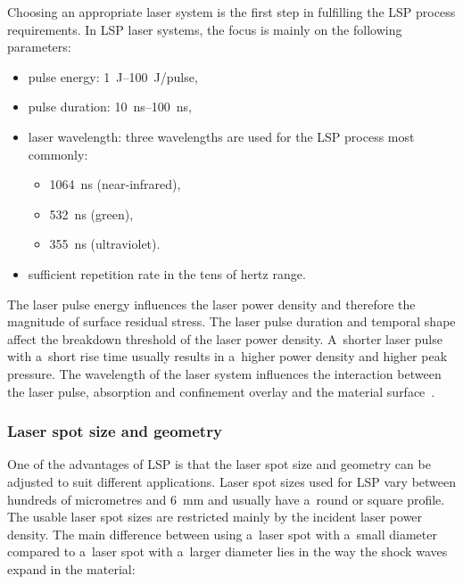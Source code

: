 Choosing an appropriate laser system is the first step in fulfilling the LSP process requirements. In LSP laser systems, the focus is mainly on the following parameters:
\begin{itemize}

    \item pulse energy: \SIrange{1}{100}{\joule}/pulse,
    \item pulse duration: \SIrange{10}{100}{\nano\second},
    
    \item laser wavelength: three wavelengths are used for the LSP process most commonly:
    
    \begin{itemize}

        \item \SI{1064}{\nano\second} (near-infrared),
        \item \SI{532}{\nano\second} (green),
        \item \SI{355}{\nano\second} (ultraviolet).

    \end{itemize}
    
    \item sufficient repetition rate in the tens of hertz range.

\end{itemize}

The laser pulse energy influences the laser power density and therefore the magnitude of surface residual stress. 
The laser pulse duration and temporal shape affect the breakdown threshold of the laser power density. A~shorter laser pulse with a~short rise time usually results in a~higher power density and higher peak pressure. 
The wavelength of the laser system influences the interaction between the laser pulse, absorption and confinement overlay and the material surface~\cite{fabbro_peyre_berthe_scherpereel_1998}. 

\subsubsection*{Laser spot size and geometry}

One of the advantages of LSP is that the laser spot size and geometry can be adjusted to suit different applications. Laser spot sizes used for LSP vary between hundreds of micrometres and \SI{6}{\milli\meter} and usually have a~round or square profile. The usable laser spot sizes are restricted mainly by the incident laser power density. The main difference between using a~laser spot with a~small diameter compared to a~laser spot with a~larger diameter lies in the way the shock waves expand in the material:

